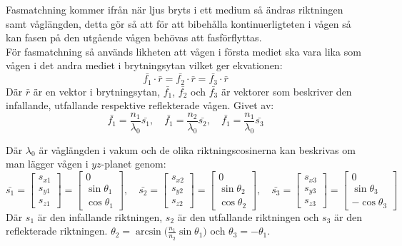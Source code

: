 \documentclass{article}
\begin{document}
    Fasmatchning kommer ifrån när ljus bryts i ett medium så ändras riktningen samt våglängden, detta gör så att för att bibehålla kontinuerligteten i vågen så kan fasen på den utgående vågen behövas att fasförflyttas. \\

    För fasmatchning så används likheten att vågen i första mediet ska vara lika som vågen i det andra mediet i brytningsytan vilket ger ekvationen:
    \[
      \bar{f_1}\cdot\bar{r}=\bar{f_2}\cdot\bar{r}=\bar{f_3}\cdot\bar{r}
    \]
    Där $\bar{r}$ är en vektor i brytningsytan, $\bar{f_1}$, $\bar{f_2}$ och $\bar{f_3}$ är vektorer som beskriver den infallande, utfallande respektive reflekterade vågen. Givet av:
    \[
      \bar{f_1}=\frac{n_1}{\lambda_0}\bar{s_1},\quad\bar{f_1}=\frac{n_2}{\lambda_0}\bar{s_2},\quad\bar{f_1}=\frac{n_1}{\lambda_0}\bar{s_3}
    \]

    Där $\lambda_0$ är våglängden i vakum och de olika riktningscosinerna kan beskrivas om man lägger vågen i $yz$-planet genom:
    \[
      \bar{s_1} =
      \begin{bmatrix}
        s_{x1}\\s_{y1}\\s_{z1}
      \end{bmatrix}
      =
      \begin{bmatrix}
        0\\\sin{\theta_1}\\\cos{\theta_1}
      \end{bmatrix},
      \quad
      \bar{s_2} =
      \begin{bmatrix}
        s_{x2}\\s_{y2}\\s_{z2}
      \end{bmatrix}
      =
      \begin{bmatrix}
        0\\\sin{\theta_2}\\\cos{\theta_2}
      \end{bmatrix},
      \quad
      \bar{s_3} =
      \begin{bmatrix}
        s_{x3}\\s_{y3}\\s_{z3}
      \end{bmatrix}
      =
      \begin{bmatrix}
        0\\\sin{\theta_3}\\-\cos{\theta_3}
      \end{bmatrix}
    \]
    Där $s_1$ är den infallande riktningen, $s_2$ är den utfallande riktningen och $s_3$ är den reflekterade riktningen. $\theta_2=\arcsin{\big(\frac{n_1}{n_2}\sin{\theta_1}\big)}$ och $\theta_3=-\theta_1$.\\
\end{document}
